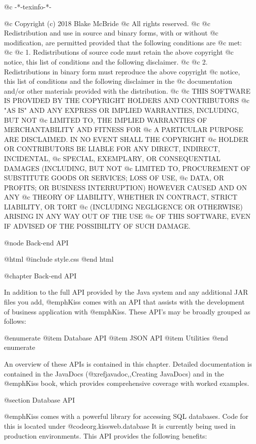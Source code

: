 @c -*-texinfo-*-

@c  Copyright (c) 2018 Blake McBride
@c  All rights reserved.
@c
@c  Redistribution and use in source and binary forms, with or without
@c  modification, are permitted provided that the following conditions are
@c  met:
@c
@c  1. Redistributions of source code must retain the above copyright
@c  notice, this list of conditions and the following disclaimer.
@c
@c  2. Redistributions in binary form must reproduce the above copyright
@c  notice, this list of conditions and the following disclaimer in the
@c  documentation and/or other materials provided with the distribution.
@c
@c  THIS SOFTWARE IS PROVIDED BY THE COPYRIGHT HOLDERS AND CONTRIBUTORS
@c  "AS IS" AND ANY EXPRESS OR IMPLIED WARRANTIES, INCLUDING, BUT NOT
@c  LIMITED TO, THE IMPLIED WARRANTIES OF MERCHANTABILITY AND FITNESS FOR
@c  A PARTICULAR PURPOSE ARE DISCLAIMED. IN NO EVENT SHALL THE COPYRIGHT
@c  HOLDER OR CONTRIBUTORS BE LIABLE FOR ANY DIRECT, INDIRECT, INCIDENTAL,
@c  SPECIAL, EXEMPLARY, OR CONSEQUENTIAL DAMAGES (INCLUDING, BUT NOT
@c  LIMITED TO, PROCUREMENT OF SUBSTITUTE GOODS OR SERVICES; LOSS OF USE,
@c  DATA, OR PROFITS; OR BUSINESS INTERRUPTION) HOWEVER CAUSED AND ON ANY
@c  THEORY OF LIABILITY, WHETHER IN CONTRACT, STRICT LIABILITY, OR TORT
@c  (INCLUDING NEGLIGENCE OR OTHERWISE) ARISING IN ANY WAY OUT OF THE USE
@c  OF THIS SOFTWARE, EVEN IF ADVISED OF THE POSSIBILITY OF SUCH DAMAGE.

@node Back-end API

@html
@include style.css
@end html

@chapter Back-end API

In addition to the full API provided by the Java system and any additional
JAR files you add, @emph{Kiss} comes with an API that assists with the
development of business application with @emph{Kiss}.  These 
API's may be broadly grouped as follows:

@enumerate
@item
Database API
@item
JSON API
@item
Utilities
@end enumerate

An overview of these APIs is contained in this chapter.  Detailed
documentation is contained in the JavaDocs (@xref{javadoc,,Creating
JavaDocs}) and in the @emph{Kiss} book, which provides comprehensive
coverage with worked examples.

@section Database API

@emph{Kiss} comes with a powerful library for accessing SQL databases.
Code for this is located under @code{org.kissweb.database} It is
currently being used in production environments.  This API provides
the following benefits:

